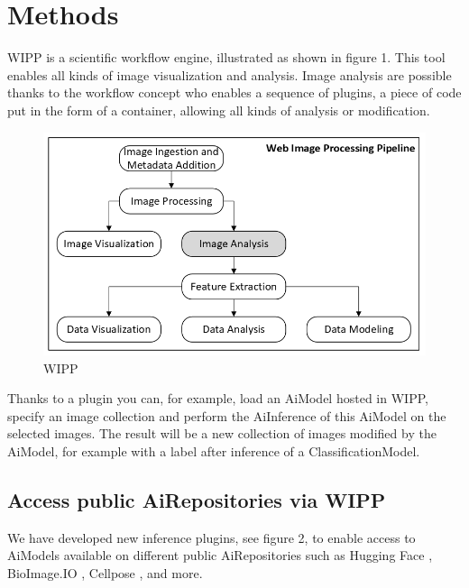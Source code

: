\section{Methods}
\label{sec:methods}

\Gls{WIPP} is a scientific workflow engine,
illustrated as shown in figure 1. This tool enables all kinds of image
visualization and analysis. Image analysis are possible thanks to the workflow
concept who enables a sequence of plugins, a piece of code put in the form of a
container, allowing all kinds of analysis or modification.

\begin{figure}[H]
  \centering
  \includegraphics[width=1.0\linewidth]{png/1_wipp.png}
  \caption{\Gls{WIPP}}
  \label{fig:1wipp}
\end{figure}

Thanks to a plugin you can, for example, load an \Gls{AiModel} hosted in
\Gls{WIPP}, specify an
image collection and perform the \Gls{AiInference} of this \Gls{AiModel} on the
selected images.
The result will be a new collection of images modified by the \Gls{AiModel}, for
example
with a label after inference of a \Gls{ClassificationModel}.

\subsection{Access public \Gls{AiRepositories} via \Gls{WIPP}}

We have developed new inference plugins, see figure 2, to enable access to
\Gls{AiModel}s available on different public \Gls{AiRepositories} such as
Hugging Face \cite{HuggingFace}, BioImage.IO \cite{BioImageIo},
Cellpose \cite{Cellpose}, and more.

